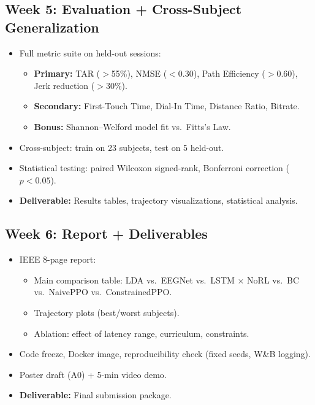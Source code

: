 \documentclass[11pt]{article}
\begin{document}
\subsection*{Week 5: Evaluation + Cross-Subject Generalization}
\begin{itemize}[leftmargin=*,nosep]
    \item Full metric suite on held-out sessions:
    \begin{itemize}[nosep]
        \item \textbf{Primary:} TAR ($>$55\%), NMSE ($<$0.30), Path Efficiency ($>$0.60), Jerk reduction ($>$30\%).
        \item \textbf{Secondary:} First-Touch Time, Dial-In Time, Distance Ratio, Bitrate.
        \item \textbf{Bonus:} Shannon--Welford model fit vs.\ Fitts's Law.
    \end{itemize}
    \item Cross-subject: train on 23 subjects, test on 5 held-out.
    \item Statistical testing: paired Wilcoxon signed-rank, Bonferroni correction ($p<0.05$).
    \item \textbf{Deliverable:} Results tables, trajectory visualizations, statistical analysis.
\end{itemize}

\subsection*{Week 6: Report + Deliverables}
\begin{itemize}[leftmargin=*,nosep]
    \item IEEE 8-page report:
    \begin{itemize}[nosep]
        \item Main comparison table: LDA vs.\ EEGNet vs.\ LSTM $\times$ NoRL vs.\ BC vs.\ NaivePPO vs.\ ConstrainedPPO.
        \item Trajectory plots (best/worst subjects).
        \item Ablation: effect of latency range, curriculum, constraints.
    \end{itemize}
    \item Code freeze, Docker image, reproducibility check (fixed seeds, W\&B logging).
    \item Poster draft (A0) + 5-min video demo.
    \item \textbf{Deliverable:} Final submission package.
\end{itemize}
\end{document}

